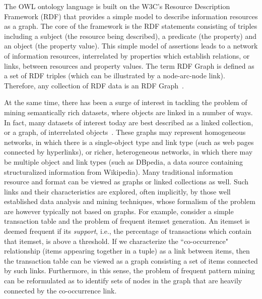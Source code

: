 The OWL ontology language is built on the W3C's Resource Description Framework (RDF) that provides a simple model to describe information resources as a graph. The core of the framework is the RDF statements consisting of triples including a subject (the resource being described), a predicate (the property) and an object (the property value). This simple model of assertions leads to a network of information resources, interrelated by properties which establish relations, or links, between resources and property values. The term RDF Graph is defined as a set of RDF triples (which can be illustrated by a node-arc-node link). Therefore, any collection of RDF data is an RDF Graph~\cite{GraphModelRDF}.

At the same time, there has been a surge of interest in tackling the problem of mining semantically rich datasets, where objects are linked in a number of ways. In fact, many datasets of interest today are best described as a linked collection, or a graph, of interrelated objects~\cite{LinkMiningGetoor}. These graphs may represent homogeneous networks, in which there is a single-object type and link type (such as web pages connected by hyperlinks), or richer, heterogeneous networks, in which there may be multiple object and link types (such as DBpedia, a data source containing structuralized information from Wikipedia). Many traditional information resource and format can be viewed as graphs or linked collections as well. Such links and their characteristics are explored, often implicitly, by those well established data analysis and mining techniques, whose formalism of the problem are however typically not based on graphs. For example, consider a simple transaction table and the problem of frequent itemset generation. An itemset is deemed frequent if its \emph{support}, i.e., the percentage of transactions which contain that itemset, is above a threshold. If we characterize the ``co-occurrence" relationship (items appearing together in a tuple) as a link between items, then the transaction table can be viewed as a graph consisting a set of items connected by such links. Furthermore, in this sense, the problem of frequent pattern mining can be reformulated as to identify sets of nodes in the graph that are heavily connected by the co-occurrence link. %

